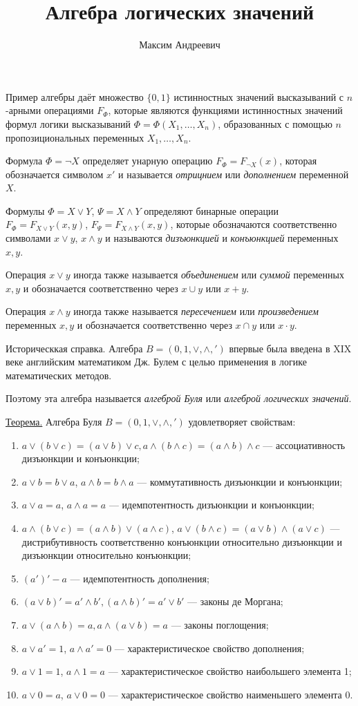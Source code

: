 \documentclass[12pt]{article}
\title{Алгебра логических значений}
\author{Максим Андреевич}
\begin{document}
\par Пример алгебры даёт множество $\{0,1\}$ истинностных значений высказываний с $n$-арными операциями $F_\Phi$, которые являются функциями истинностных значений формул логики высказываний $\Phi=\Phi(X_1,\dots,X_n)$, образованных с помощью $n$ пропозициональных переменных $X_1, \dots, X_n$.
\par Формула $\Phi = \neg X$ определяет унарную операцию $F_\Phi = F_{\neg X}(x)$, которая обозначается символом $x'$ и называется \textit{отрицнием} или \textit{дополнением} переменной $X$.
\par Формулы $\Phi = X \lor Y$, $\Psi = X \land Y$ определяют бинарные операции $F_\Phi = F_{X \lor Y}(x, y)$, $F_\Psi = F_{X \land Y}(x, y)$, которые обозначаются соответственно символами $x \lor y$, $x \land y$ и называются \textit{дизъюнкцией} и \textit{конъюнкцией} переменных $x, y$.
\par Операция $x \lor y$ иногда также называется \textit{объединением} или \textit{суммой} переменных $x, y$ и обозначается соответственно через $x \cup y$ или $x + y$.
\par Операция $x \land y$ иногда также называется \textit{пересечением} или \textit{произведением} переменных $x, y$ и обозначается соответственно через $x \cap y$ или $x \cdot y$.
\par Историческкая справка. Алгебра $B=({0,1},\lor,\land,')$ впервые была введена в XIX веке английским математиком Дж. Булем с целью применения в логике математических методов.
\par Поэтому эта алгебра называется \textit{алгеброй Буля} или \textit{алгеброй логических значений}.
\par \underline{Теорема.} Алгебра Буля $B=({0,1},\lor,\land,')$ удовлетворяет свойствам:
\begin{enumerate}
    \item $a \lor (b \lor c) = (a \lor b) \lor c, a \land (b \land c) = (a \land b) \land c$ --- ассоциативность дизъюнкции и конъюнкции;
    \item $a \lor b = b \lor a$, $a \land b = b \land a$  --- коммутативность дизъюнкции и конъюнкции;
    \item $a \lor a = a$, $a \land a = a$ --- идемпотентность дизъюнкции и конъюнкции;
    \item $a \land (b \lor c) = (a \land b) \lor (a \land c)$, $a \lor (b \land c) = (a \lor b) \land (a \lor c)$ --- дистрибутивность соответственно конъюнкции относительно дизъюнкции и дизъюнкции относительно конъюнкции;
    \item $(a')' - a$ --- идемпотентность дополнения;
    \item $(a \lor b)' = a' \land b', (a \land b)' = a' \lor b'$ --- законы де Моргана;
    \item $a \lor (a \land b) = a, a \land (a \lor b) = a$ --- законы поглощения;
    \item $a \lor a' = 1$, $a \land a' = 0$ --- характеристическое свойство дополнения;
    \item $a \lor 1 = 1$, $a \land 1 = a$ --- характеристическое свойство наибольшего элемента 1;
    \item $a \lor 0 = a$, $a \lor 0 = 0$ --- характеристическое свойство наименьшего элемента 0.
\end{enumerate}
\end{document}

